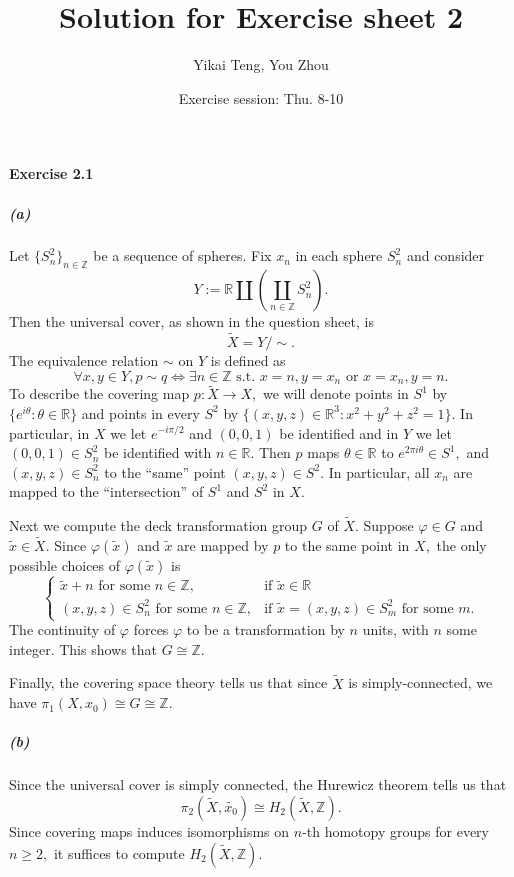 \documentclass{article}
\title{Solution for Exercise sheet 2}
\author{Yikai Teng, You Zhou}
\date{Exercise session: Thu. 8-10}
\begin{document}
\maketitle

\paragraph{Exercise 2.1}
\subparagraph{(a)}Let $\{S_n^2\}_{n\in\mathbb{Z}}$ be a sequence of spheres. Fix $x_n$ in each sphere $S_n^2$ and consider
\[Y:=\mathbb{R}\coprod\left(\coprod_{n\in\mathbb{Z}}S_n^{2}\right).\]
Then the universal cover, as shown in the question sheet, is
\[\widetilde{X}=Y/\sim.\]
The equivalence relation $\sim$ on $Y$ is defined as
\[\forall x,y\in Y, p\sim q\Leftrightarrow\exists n\in\mathbb{Z} \text{ s.t. } x=n, y=x_n\text{ or }x=x_n, y=n.\]
To describe the covering map $p\colon\widetilde{X}\rightarrow X,$ we will denote points in $S^1$ by $\{e^{i\theta}:\theta\in\mathbb{R}\}$ and points in every $S^2$ by $\{(x,y,z)\in\mathbb{R}^3:x^2+y^2+z^2=1\}.$ In particular, in $X$ we let $e^{-i\pi/2}$ and $(0,0,1)$ be identified and in $Y$ we let $(0,0,1)\in S_n^2$ be identified with $n\in\mathbb{R}.$ Then $p$ maps $\theta\in\mathbb{R}$ to $e^{2\pi i\theta}\in S^1,$ and $(x,y,z)\in S_n^2$ to the ``same'' point $(x,y,z)\in S^2.$ In particular, all $x_n$ are mapped to the ``intersection'' of $S^1$ and $S^2$ in $X.$

Next we compute the deck transformation group $G$ of $\widetilde{X}.$ Suppose $\varphi\in G$ and $\tilde{x}\in\widetilde{X}.$ Since $\varphi(\tilde{x})$ and $\tilde{x}$ are mapped by $p$ to the same point in $X,$ the only possible choices of $\varphi(\tilde{x})$ is
\[\begin{cases}
  \tilde{x}+n \text{ for some }n\in\mathbb{Z}, & \mbox{if } \tilde{x}\in\mathbb{R} \\
  (x,y,z)\in S_n^2\text{ for some }n\in\mathbb{Z}, & \mbox{if } \tilde{x}=(x,y,z)\in S_m^2\text{ for some }m.
\end{cases}\]
The continuity of $\varphi$ forces $\varphi$ to be a transformation by $n$ units, with $n$ some integer. This shows that $G\cong\mathbb{Z}.$

Finally, the covering space theory tells us that since $\widetilde{X}$ is simply-connected, we have $\pi_1(X,x_0)\cong G\cong\mathbb{Z}.$

\subparagraph{(b)}
Since the universal cover is simply connected, the Hurewicz theorem tells us that
\[\pi_2(\widetilde{X},\tilde{x_0})\cong H_2(\widetilde{X},\mathbb{Z}).\]
Since covering maps induces isomorphisms on $n$-th homotopy groups for every $n\geq2,$ it suffices to compute $H_2(\widetilde{X},\mathbb{Z}).$
\end{document}

